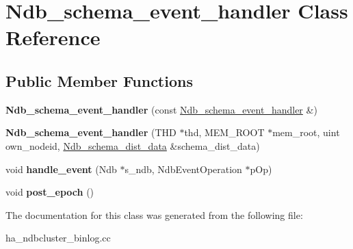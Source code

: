 \hypertarget{classNdb__schema__event__handler}{}\section{Ndb\+\_\+schema\+\_\+event\+\_\+handler Class Reference}
\label{classNdb__schema__event__handler}
\subsection*{Public Member Functions}
\begin{DoxyCompactItemize}
\item 
\mbox{\label{classNdb__schema__event__handler_af06f39932ad1cd78ba98566d74e09863}} 
{\bfseries Ndb\+\_\+schema\+\_\+event\+\_\+handler} (const \mbox{\hyperlink{classNdb__schema__event__handler}{Ndb\+\_\+schema\+\_\+event\+\_\+handler}} \&)
\item 
\mbox{\label{classNdb__schema__event__handler_aa8df007d99bbb4ae816ef3056219e69c}} 
{\bfseries Ndb\+\_\+schema\+\_\+event\+\_\+handler} (T\+HD $\ast$thd, M\+E\+M\+\_\+\+R\+O\+OT $\ast$mem\+\_\+root, uint own\+\_\+nodeid, \mbox{\hyperlink{classNdb__schema__dist__data}{Ndb\+\_\+schema\+\_\+dist\+\_\+data}} \&schema\+\_\+dist\+\_\+data)
\item 
\mbox{\label{classNdb__schema__event__handler_ace3d1597d470e4c174d360dbfd870872}} 
void {\bfseries handle\+\_\+event} (Ndb $\ast$s\+\_\+ndb, Ndb\+Event\+Operation $\ast$p\+Op)
\item 
\mbox{\label{classNdb__schema__event__handler_acf9df00f3269aaabce632a0e3de1e5bb}} 
void {\bfseries post\+\_\+epoch} ()
\end{DoxyCompactItemize}


The documentation for this class was generated from the following file\+:\begin{DoxyCompactItemize}
\item 
ha\+\_\+ndbcluster\+\_\+binlog.\+cc\end{DoxyCompactItemize}
